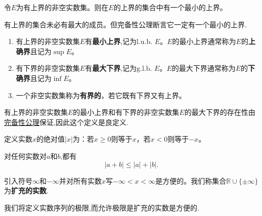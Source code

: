 \documentclass[lang=cn,newtx,10pt,scheme=chinese]{elegantbook}
\begin{document}
\begin{axiom}[完备性公理]\label{axiom:完备性公理}
  令\(E\)为有上界的非空实数集。则在\(E\)的上界的集合中有一个最小的上界。
\end{axiom}
\begin{note}
  有上界的集合未必有最大的成员。但完备性公理断言它一定有一个最小的上界.
\end{note}

\begin{definition}[上下确界]\label{definition:上下确界}
\begin{enumerate}
  \item 有上界的非空实数集\(E\)有\textbf{最小上界},记为\(\text{l.u.b. }E\)。\(E\)的最小上界通常称为\(E\)的\textbf{上确界}且记为\(\sup E\)。

  \item 有下界的非空实数集\(E\)有\textbf{最大下界},记为\(\text{g.l.b. }E\)。\(E\)的最大下界通常称为\(E\)的\textbf{下确界}且记为\(\inf E\)。

  \item 一个非空实数集称为\textbf{有界的}，若它既有下界又有上界。
\end{enumerate}
\end{definition}
\begin{remark}
  有上界的非空实数集\(E\)的最小上界和有下界的非空实数集\(E\)的最大下界的存在性由\hyperref[axiom:完备性公理]{完备性公理}保证,因此这个定义是良定义.
\end{remark}

\begin{definition}[实数的绝对值]\label{definition:绝对值}
  定义实数\(x\)的绝对值\(\vert x\vert\)为：若\(x\geqslant0\)则等于\(x\)，若\(x<0\)则等于\(-x\)。
\end{definition}

\begin{theorem}[三角不等式]\label{theorem:三角不等式}
对任何实数对\(a\)和\(b\),都有
  \[
    \left| a+b \right|\leqslant \left| a \right|+\left| b \right|.
  \]
\end{theorem}

\begin{definition}[扩充的实数]\label{definition:扩充的实数}
  引入符号\(\infty\)和\(-\infty\)并对所有实数\(x\)写\(-\infty<x<\infty\)是方便的。我们称集合\(\mathbb{R}\cup\{\pm\infty\}\)为\textbf{扩充的实数}.
\end{definition}
\begin{note}
  我们将定义实数序列的极限,而允许极限是扩充的实数是方便的.
\end{note}
\end{document}

